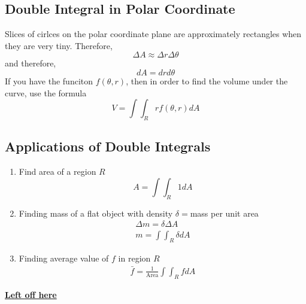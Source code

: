\documentclass[12pt]{article}
\theoremstyle{break}
\numberwithin{theorem}{subsection}
\numberwithin{lemma}{subsection}
\numberwithin{corollary}{subsection}
\numberwithin{equation}{subsection}
\begin{document}
\subsection{Double Integral in Polar Coordinate}
Slices of cirlces on the polar coordinate plane are approximately rectangles when they are very tiny. Therefore,
\begin{equation*}
	\Delta A \approx \Delta r \Delta \theta
\end{equation*}
and therefore, 
\begin{equation*}
	dA = dr d\theta
\end{equation*}
If you have the funciton $f(\theta,r)$, then in order to find the volume under the curve, use the formula
\begin{equation*}
	V = \int \int_R rf(\theta,r) dA
\end{equation*}

\subsection{Applications of Double Integrals}
\begin{enumerate}
	\item Find area of a region $R$
	\begin{equation*}
		A = \int \int_R 1 dA 
	\end{equation*}
	\item Finding mass of a flat object with density $\delta = $mass per unit area
	\begin{align*}
		\Delta m = \delta \Delta A \\
		m = \int \int_R \delta dA
	\end{align*}
	\item Finding average value of $f$ in region $R$
	\begin{align*}
		\bar f = \frac1{\text{Area}} \int \int_R f dA
	\end{align*}
\end{enumerate}

\href{https://youtu.be/60e4hdCi1D4?t=1308}{\bf Left off here}
\end{document}
